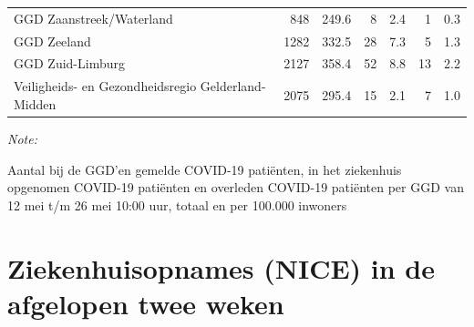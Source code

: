 \documentclass[
  english,
  man,floatsintext]{apa6}
\begin{document}
\begin{table}
\begin{threeparttable}
\begin{tabular}{lrrrrrr}
GGD Zaanstreek/Waterland & 848 & 249.6 & 8 & 2.4 & 1 & 0.3\\
GGD Zeeland & 1282 & 332.5 & 28 & 7.3 & 5 & 1.3\\
GGD Zuid-Limburg & 2127 & 358.4 & 52 & 8.8 & 13 & 2.2\\
Veiligheids- en Gezondheidsregio Gelderland-Midden & 2075 & 295.4 & 15 & 2.1 & 7 & 1.0\\
\bottomrule
\end{tabular}
\begin{tablenotes}
\item \textit{Note: } 
\item Aantal bij de GGD’en gemelde COVID-19 patiënten, in het ziekenhuis opgenomen COVID-19 patiënten en overleden COVID-19 patiënten per GGD van 12 mei t/m 26 mei 10:00 uur, totaal en per 100.000 inwoners
\end{tablenotes}
\end{threeparttable}
\endgroup{}
\end{table}

\newpage

\hypertarget{ziekenhuisopnames-nice-in-de-afgelopen-twee-weken}{%
\section{Ziekenhuisopnames (NICE) in de afgelopen twee weken}\label{ziekenhuisopnames-nice-in-de-afgelopen-twee-weken}}
\end{document}
